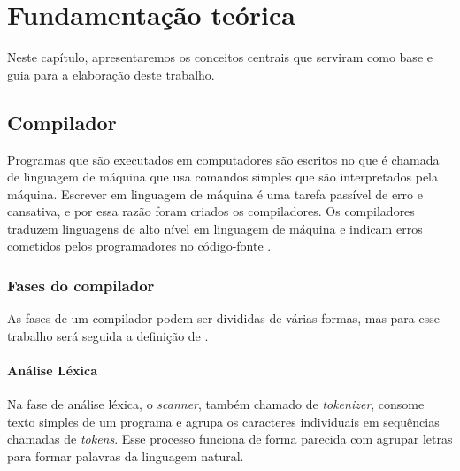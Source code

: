 \chapter{Fundamentação teórica}\label{cap:fundamentacao-teorica}

Neste capítulo, apresentaremos os conceitos centrais que serviram como base e guia para a elaboração deste trabalho.

\section{Compilador}
Programas que são executados em computadores são escritos no que é chamada de linguagem de máquina que usa comandos simples que são interpretados pela máquina. Escrever em linguagem de máquina é uma tarefa passível de erro e cansativa, e por essa razão foram criados os compiladores. Os compiladores traduzem linguagens de alto nível em linguagem de máquina e indicam erros cometidos pelos programadores no código-fonte \cite{mogensen2024introduction}.

\subsection{Fases do compilador}
As fases de um compilador podem ser divididas de várias formas, mas para esse trabalho será seguida a definição de \textcite{thain2020introduction}. 


\begin{figure}[ht]
    \captionsetup{width=16cm}
\end{figure}
\FloatBarrier

\subsubsection{Análise Léxica}
Na fase de análise léxica, o \textit{scanner}, também chamado de \textit{tokenizer}, consome texto simples de um programa e agrupa os caracteres individuais em sequências chamadas de \textit{tokens}. Esse processo funciona de forma parecida com agrupar letras para formar palavras da linguagem natural.

